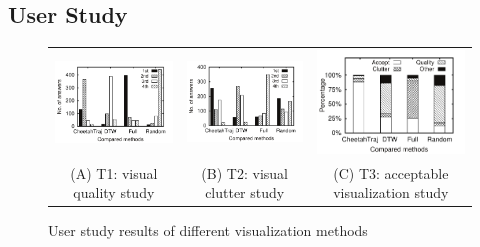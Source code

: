 \subsection{User Study}\label{sec:user}

\begin{figure}
     \centering
     \begin{tabular}{ccc}
		\includegraphics[width=0.6\columnwidth]{pictures/user_study/quality}
		&
		\includegraphics[width=0.6\columnwidth]{pictures/user_study/clutter}
        &
        \includegraphics[width=0.6\columnwidth]{pictures/user_study/accept}
		\\
		(A) T1: visual quality study
		&
		(B) T2: visual clutter study
        &
        (C) T3: acceptable visualization study
	\end{tabular}
	\caption{User study results of different visualization methods}
	\label{fig:userstudy}
    \trim
\end{figure}

